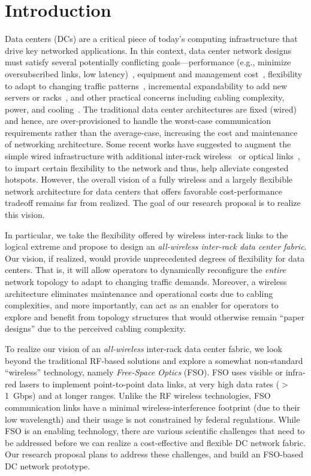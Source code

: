 \section{Introduction}

Data centers (DCs) are a critical piece of today's computing infrastructure
that drive  key networked applications.
In this context, data center network designs must satisfy several potentially
conflicting goals---performance (e.g., minimize oversubscribed links,
low latency)~\cite{fattree,vl2}, equipment and management
cost~\cite{fattree,popa-cost}, flexibility to adapt to changing
traffic patterns~\cite{proteus,3db,flyways,cthru}, incremental
expandability to add new servers or racks~\cite{legup,jellyfish}, and
other practical concerns including cabling complexity, power, and
cooling~\cite{farrington,portland,cabling}.
%
The traditional data center architectures are fixed (wired) and hence,
are over-provisioned to handle the worst-case communication
requirements rather than the average-case, increasing the cost and
maintenance of networking architecture.
%
Some recent works have suggested to augment the simple wired
infrastructure with additional inter-rack wireless~\cite{flyways,3db}
or optical links~\cite{cthru}, to impart certain flexibility to the
network and thus, help alleviate congested hotspots.
%
However, the overall vision of a fully wireless and a largely
flexibible network architecture for data centers that offers favorable
cost-performance tradeoff remains far from realized. The goal of our
research proposal is to realize this vision. 


  In particular, we take the flexibility offered
by wireless inter-rack links to the logical extreme and propose to
design an \emph{all-wireless inter-rack data center fabric}. Our
vision, if realized, would provide unprecedented degrees of
flexibility for data centers. That is, it will allow operators to
dynamically reconfigure the {\em entire} network topology to adapt to
changing traffic demands. Moreover, a wireless architecture eliminates
maintenance and operational costs due to cabling complexities, and
more importantly, can act as an enabler for operators to explore and
benefit from topology structures that would otherwise remain ``paper
designs'' due to the perceived cabling complexity.

To realize our vision of an \emph{all-wireless} inter-rack data center
fabric, we look beyond the traditional RF-based solutions and explore
a somewhat non-standard ``wireless'' technology, namely {\em
  Free-Space Optics} (FSO).  FSO uses visible or infra-red lasers to
implement point-to-point data links, at very high data rates
($>$1~Gbps) and at longer ranges. Unlike the RF wireless technologies,
FSO communication links have a minimal wireless-interference footprint
(due to their low wavelength) and their usage is not constrained by
federal regulations.
%
While FSO is an enabling technology, there are various scientific
challenges that need to be addressed before we can realize a
cost-effective and flexible DC network fabric. Our research proposal
plans to address these challenges, and build an FSO-based DC network
prototype.

